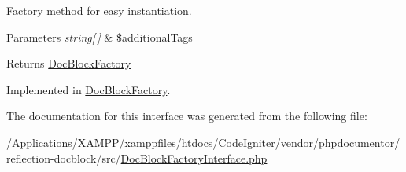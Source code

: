 Factory method for easy instantiation.


\begin{DoxyParams}{Parameters}
{\em string\mbox{[}$\,$\mbox{]}} & \$additional\+Tags\\
\hline
\end{DoxyParams}
\begin{DoxyReturn}{Returns}
\mbox{\hyperlink{classphp_documentor_1_1_reflection_1_1_doc_block_factory}{Doc\+Block\+Factory}} 
\end{DoxyReturn}


Implemented in \mbox{\hyperlink{classphp_documentor_1_1_reflection_1_1_doc_block_factory_a220aa312016b6fa0c9a6c4bf61a7ead4}{Doc\+Block\+Factory}}.



The documentation for this interface was generated from the following file\+:\begin{DoxyCompactItemize}
\item 
/\+Applications/\+X\+A\+M\+P\+P/xamppfiles/htdocs/\+Code\+Igniter/vendor/phpdocumentor/reflection-\/docblock/src/\mbox{\hyperlink{_doc_block_factory_interface_8php}{Doc\+Block\+Factory\+Interface.\+php}}\end{DoxyCompactItemize}
